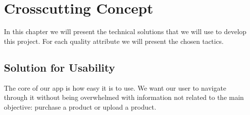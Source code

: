 \section{Crosscutting Concept}

In this chapter we will present the technical solutions that we will use to develop this project.
For each quality attribute we will present the chosen tactics.

\subsection{Solution for Usability}

The core of our app is how easy it is to use. We want our user to navigate through it without being overwhelmed with information
not related to the main objective: purchase a product or upload a product.



